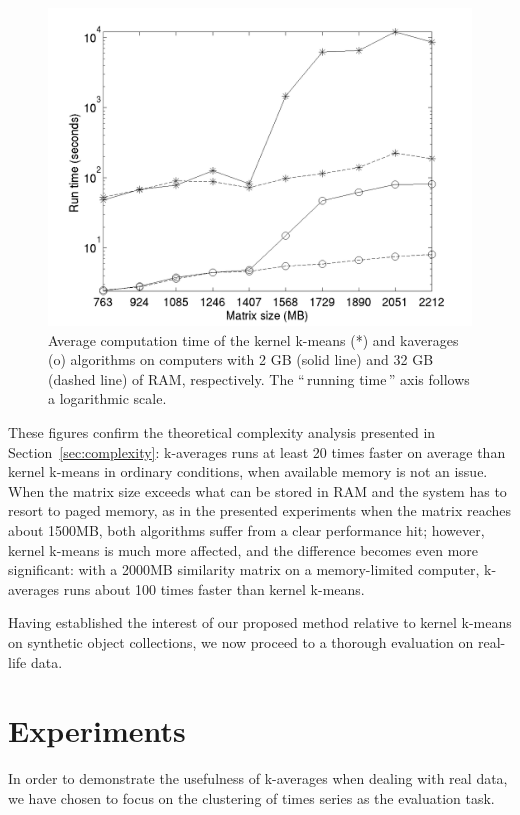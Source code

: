 \documentclass[a4paper,twoside]{article}
\newcommand{\gl}[1]{``\,#1\,''} %
\begin{document}
\begin{figure}
\center
\includegraphics[scale=0.4]{figures/simpleSwap.png} 
\caption{Average computation time of the kernel k-means (*) and kaverages (o) algorithms on computers with 2 GB (solid line) and 32 GB (dashed line) of RAM, respectively. The \gl{running time} axis follows a logarithmic scale.}
\label{fig:timing}
\end{figure}

These figures confirm the theoretical complexity analysis presented in Section~\ref{sec:complexity}: k-averages runs at least 20 times faster on average than kernel k-means in ordinary conditions, when  available memory is not an issue. When the matrix size exceeds what can be stored in RAM and the system has to resort to paged memory, as in the presented experiments when the matrix reaches about 1500MB, both algorithms suffer from a clear performance hit; however, kernel k-means is much more affected, and the difference becomes even more significant: with a 2000MB similarity matrix on a memory-limited computer, k-averages runs about 100 times faster than kernel k-means.

Having established the interest of our proposed method relative to kernel k-means on synthetic object collections, we now proceed to a thorough evaluation on real-life data.

\section{Experiments}
\label{sec:experiments}

In order to demonstrate the usefulness of k-averages when dealing with real data, we have chosen to focus on the clustering of times series as the evaluation task.
\end{document}
